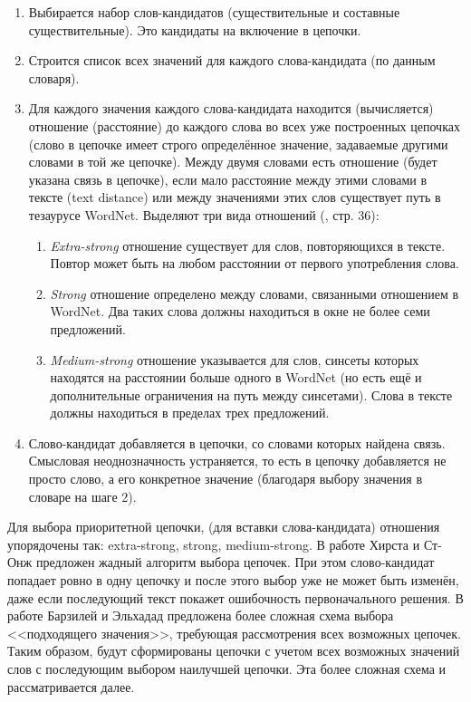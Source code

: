 \documentclass{article}
\begin{document}
\begin{articletext}
\begin{enumerate} 
\item Выбирается набор слов-кандидатов (существительные и составные существительные). Это кандидаты на включение в цепочки.
\item Строится список всех значений для каждого слова-кандидата (по данным словаря).
\item Для каждого значения каждого слова-кандидата находится (вычисляется) отношение (расстояние) до каждого слова во всех уже построенных цепочках (слово в цепочке имеет строго определённое значение, задаваемые другими словами в той же цепочке). Между двумя словами есть отношение (будет указана связь в цепочке), если мало расстояние между этими словами в тексте (text distance) или между значениями этих слов существует путь в тезаурусе WordNet. Выделяют три вида отношений (\cite{Do Thuy Duong 2011}, стр. 36):
\begin{enumerate} 
\item \textit{Extra-strong} отношение существует для слов, повторяющихся в тексте. Повтор может быть на любом расстоянии от первого употребления слова.
\item \textit{Strong} отношение определено между словами, связанными отношением в WordNet. Два таких слова должны находиться в окне не более семи предложений.
\item \textit{Medium-strong} отношение указывается для слов, синсеты которых находятся на расстоянии больше одного в WordNet (но есть ещё и дополнительные ограничения на путь между синсетами). Слова в тексте должны находиться в пределах трех предложений.
\end{enumerate} 
\item Слово-кандидат добавляется в цепочки, со словами которых найдена связь. Смысловая неоднозначность устраняется, то есть в цепочку добавляется не просто слово, а его конкретное значение (благодаря выбору значения в словаре на шаге 2).
\end{enumerate} 

Для выбора приоритетной цепочки, (для вставки слова-кандидата) отношения упорядочены так: extra-strong, strong, medium-strong. В работе Хирста и Ст-Онж \cite{Hirst St-Onge 1998} предложен жадный алгоритм выбора цепочек. При этом слово-кандидат попадает ровно в одну цепочку и после этого выбор уже не может быть изменён, даже если последующий текст покажет ошибочность первоначального решения. В работе Барзилей и Эльхадад \cite{Barzilay Elhadad 1997} предложена более сложная схема выбора <<подходящего значения>>, требующая рассмотрения всех возможных цепочек. Таким образом, будут сформированы цепочки с учетом всех возможных значений слов с последующим выбором наилучшей цепочки. Эта более сложная схема и рассматривается далее.


\end{articletext}
\end{document}

